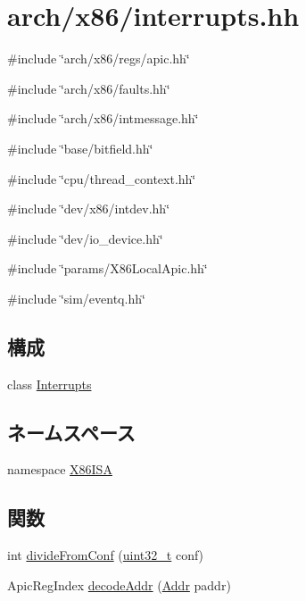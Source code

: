 \hypertarget{x86_2interrupts_8hh}{
\section{arch/x86/interrupts.hh}
\label{x86_2interrupts_8hh}
}
{\ttfamily \#include \char`\"{}arch/x86/regs/apic.hh\char`\"{}}\par
{\ttfamily \#include \char`\"{}arch/x86/faults.hh\char`\"{}}\par
{\ttfamily \#include \char`\"{}arch/x86/intmessage.hh\char`\"{}}\par
{\ttfamily \#include \char`\"{}base/bitfield.hh\char`\"{}}\par
{\ttfamily \#include \char`\"{}cpu/thread\_\-context.hh\char`\"{}}\par
{\ttfamily \#include \char`\"{}dev/x86/intdev.hh\char`\"{}}\par
{\ttfamily \#include \char`\"{}dev/io\_\-device.hh\char`\"{}}\par
{\ttfamily \#include \char`\"{}params/X86LocalApic.hh\char`\"{}}\par
{\ttfamily \#include \char`\"{}sim/eventq.hh\char`\"{}}\par
\subsection*{構成}
\begin{DoxyCompactItemize}
\item 
class \hyperlink{classX86ISA_1_1Interrupts}{Interrupts}
\end{DoxyCompactItemize}
\subsection*{ネームスペース}
\begin{DoxyCompactItemize}
\item 
namespace \hyperlink{namespaceX86ISA}{X86ISA}
\end{DoxyCompactItemize}
\subsection*{関数}
\begin{DoxyCompactItemize}
\item 
int \hyperlink{x86_2interrupts_8hh_a849c576f20c815c41bcb63318035ab93}{divideFromConf} (\hyperlink{Type_8hh_a435d1572bf3f880d55459d9805097f62}{uint32\_\-t} conf)
\item 
ApicRegIndex \hyperlink{namespaceX86ISA_adb790daea6d2a4198290c636a655fbc7}{decodeAddr} (\hyperlink{base_2types_8hh_af1bb03d6a4ee096394a6749f0a169232}{Addr} paddr)
\end{DoxyCompactItemize}


